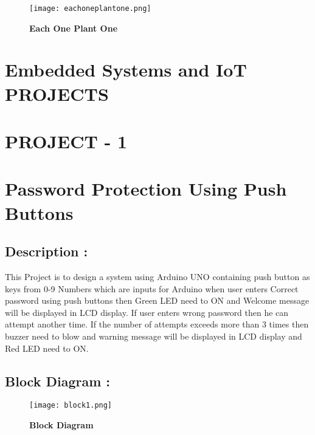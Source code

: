 \documentclass[12pt]{article}
\begin{document}
\begin{figure}[h]
\centering
\texttt{[image: eachoneplantone.png]}
\caption{\textbf{Each One Plant One}}
\label{each_one_plant_one}
\end{figure}

\begin{center}
\section*{{\large Embedded Systems and IoT \\ PROJECTS}}
 \section*{PROJECT - 1}
\section*{\textbf{Password Protection Using Push Buttons}}
\end{center}

\subsection*{\textbf{Description :}}
 This Project is to design a system using Arduino UNO containing push button as keys from 0-9 Numbers which are inputs for Arduino when user enters Correct password using push buttons then Green LED need to ON and Welcome message will be displayed in LCD display. If user enters wrong password then he can attempt another time. If the number of attempts exceeds more than 3 times then buzzer need to blow and warning message will be displayed in LCD display and Red LED need to ON.\\ 
 
 
 \subsection*{\textbf{Block Diagram :\\}}
 
 \begin{figure}[h]
\centering
\texttt{[image: block1.png]}
\caption{\textbf{Block Diagram}}
\label{block_diagram1}
\end{figure}
\end{document}
